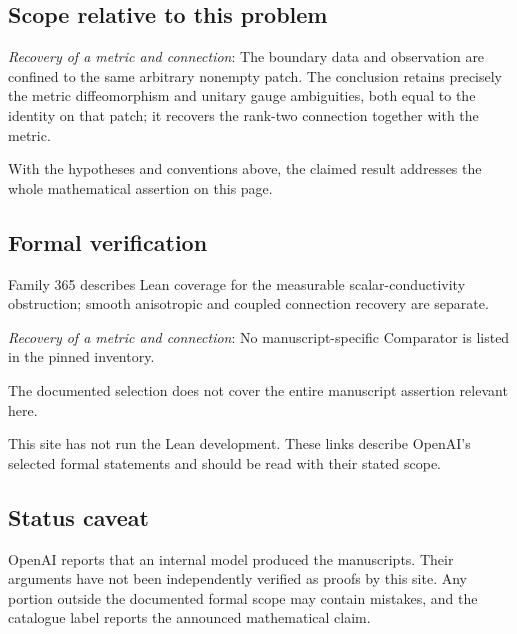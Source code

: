 \documentclass[11pt]{article}
\begin{document}
\subsection{Scope relative to this problem}
\textit{Recovery of a metric and connection}: The boundary data and observation are confined to the same arbitrary nonempty patch. The conclusion retains precisely the metric diffeomorphism and unitary gauge ambiguities, both equal to the identity on that patch; it recovers the rank-two connection together with the metric.

With the hypotheses and conventions above, the claimed result addresses the whole mathematical assertion on this page.

\subsection{Formal verification}
Family 365 describes Lean coverage for the measurable scalar-conductivity obstruction; smooth anisotropic and coupled connection recovery are separate.

\textit{Recovery of a metric and connection}: No manuscript-specific Comparator is listed in the pinned inventory.

The documented selection does not cover the entire manuscript assertion relevant here.

This site has not run the Lean development. These links describe OpenAI’s selected formal statements and should be read with their stated scope.

\subsection{Status caveat}
OpenAI reports that an internal model produced the manuscripts. Their arguments have not been independently verified as proofs by this site. Any portion outside the documented formal scope may contain mistakes, and the catalogue label reports the announced mathematical claim.
\end{document}
